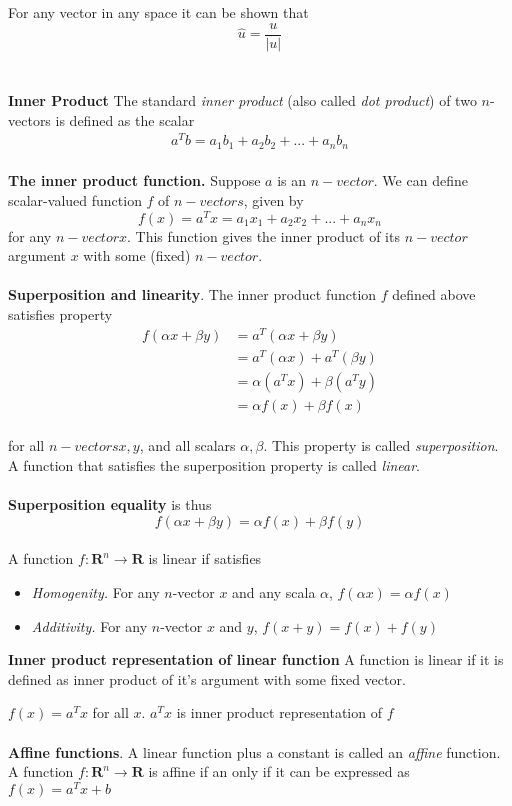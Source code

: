 \documentclass[a4paper, 12pt]{article}
\begin{document}
\\
\\
For any vector in any space it can be shown that
\[
\hat{u} = \frac{u}{|u|}
\]
\\
\\
\textbf{Inner Product}
The standard \textit{inner product} (also called \textit{dot product}) of 
two $n$-vectors is defined as the scalar
\begin{align*}
a^Tb = a_1b_1 + a_2b_2 + ... + a_nb_n
\end{align*}
\\
\textbf{The inner product function.} Suppose $a$ is an $n-vector$. We can define scalar-valued
function $f$ of $n-vectors$, given by
\begin{equation}
f(x) = a^Tx = a_1x_1 + a_2x_2+...+a_nx_n
\end{equation}
for any $n-vector x$. This function gives the inner product of its $n-vector$ argument $x$ with
some (fixed) $n-vector$.
\\
\\
\textbf{Superposition and linearity}. The inner product function $f$ defined above satisfies
property
\begin{align*}
f(\alpha x +\beta y) &= a^T(\alpha x + \beta y) \\
&= a^T(\alpha x) + a^T(\beta y) \\
&= \alpha(a^Tx) + \beta(a^Ty) \\
&= \alpha f(x) + \beta f(x)
\end{align*}
\\
for all $n-vectors x, y$, and all scalars $\alpha, \beta$. This property is called \textit{superposition}.
 A function that satisfies the superposition property is called \textit{linear}.
\\
\\
\textbf{Superposition equality} is thus
\begin{equation}
f(\alpha x + \beta y) = \alpha f(x) + \beta f(y)
\end{equation}
\\
A function  $ f: \mathbf{R}^n \to \mathbf{R} $ is linear if satisfies
\begin{itemize}
\item \textit{Homogenity.} For any $n$-vector $x$ and any scala $\alpha$, $f(\alpha x) = \alpha f(x)$
\item \textit{Additivity.} For any $n$-vector $x$ and $y$, $f(x + y) = f(x) + f(y)$
\end{itemize}

\textbf{Inner product representation of linear function}
A function is linear if it is defined as inner product of it's argument with some fixed vector.

$f(x) = a^Tx$ for all $x$.
$a^Tx$ is inner product representation of $f$
\\
\\
\textbf{Affine functions}. A linear function plus a constant is called an \textit{affine} function.
A function $f: \mathbf{R} ^n \to \mathbf{R}$ is affine if an only if it can be expressed as $f(x) = a^T x + b$
\end{document}
